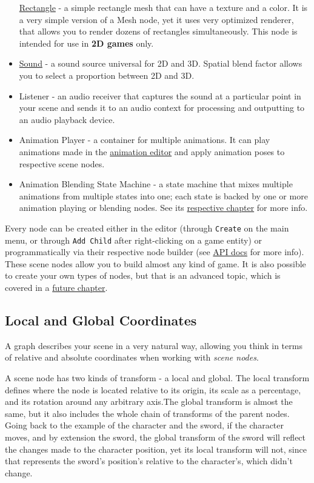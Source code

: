 \documentclass[
]{book}
\theoremstyle{definition}
\theoremstyle{definition}
\theoremstyle{definition}
\theoremstyle{definition}
\theoremstyle{remark}
\begin{document}
\begin{itemize}
  \href{../scene/rectangle.md}{Rectangle} - a simple rectangle mesh that can have a texture and a color. It is a very simple version of a Mesh node, yet it uses very optimized renderer, that allows you to render dozens of rectangles simultaneously. This node is intended for use in \textbf{2D games} only.
\item
  \href{../sound/sound.md}{Sound} - a sound source universal for 2D and 3D. Spatial blend factor allows you to select a proportion between 2D and 3D.
\item
  Listener - an audio receiver that captures the sound at a particular point in your scene and sends it to an audio context for processing and outputting to an audio playback device.
\item
  Animation Player - a container for multiple animations. It can play animations made in the \href{../animation/anim_editor.md}{animation editor} and apply animation poses to respective scene nodes.
\item
  Animation Blending State Machine - a state machine that mixes multiple animations from multiple states into one; each state is backed by one or more animation playing or blending nodes. See its \href{../animation/absm_editor.md}{respective chapter} for more info.
\end{itemize}

Every node can be created either in the editor (through \texttt{Create} on the main menu, or through \texttt{Add\ Child} after right-clicking on a game entity) or programmatically via their respective node builder (see \href{https://docs.rs/fyrox/latest/fyrox/scene/index.html}{API docs} for more info). These scene nodes allow you to build almost any kind of game. It is also possible to create your own types of nodes, but that is an advanced topic, which is covered in a \href{../scene/custom_node.md}{future chapter}.

\subsection{Local and Global Coordinates}\label{local-and-global-coordinates}

A graph describes your scene in a very natural way, allowing you think in terms of relative and absolute coordinates when working with \emph{scene nodes}.

A scene node has two kinds of transform - a local and global. The local transform defines where the node is located relative to its origin, its scale as a percentage, and its rotation around any arbitrary axis.The global transform is almost the same, but it also includes the whole chain of transforms of the parent nodes. Going back to the example of the character and the sword, if the character moves, and by extension the sword, the global transform of the sword will reflect the changes made to the character position, yet its local transform will not, since that represents the sword's position's relative to the character's, which didn't change.
\end{document}
